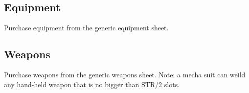\subsection{Equipment }
Purchase equipment from the generic equipment sheet.

\addtocounter{MechaSteps}{1}

\subsection{Weapons }
Purchase weapons from the generic weapons sheet. Note: a mecha suit can weild any hand-held weapon that is no bigger than STR/2 slots.

